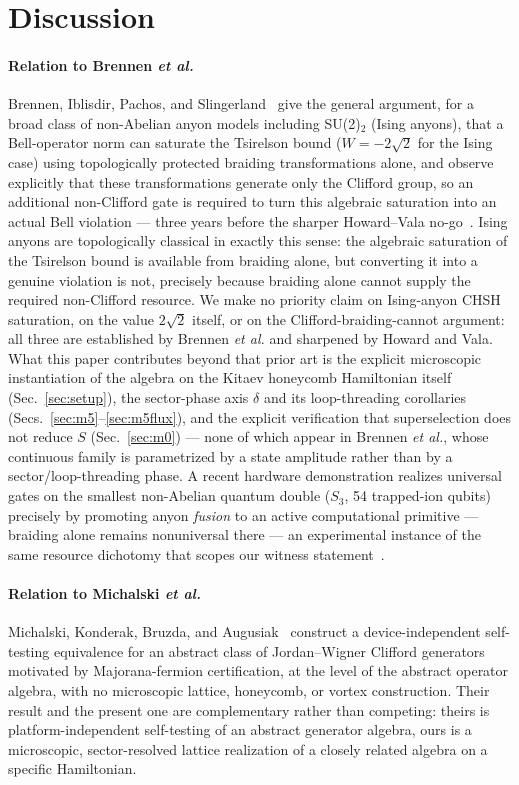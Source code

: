\documentclass[aps,pra,twocolumn,superscriptaddress,floatfix,nofootinbib]{revtex4-2}
\begin{document}
\section{Discussion}
\label{sec:discussion}

\paragraph{Relation to Brennen \emph{et al.}} Brennen, Iblisdir,
Pachos, and Slingerland~\cite{Brennen2009} give the general argument,
for a broad class of non-Abelian anyon models including SU(2)$_2$
(Ising anyons), that a Bell-operator norm can saturate the Tsirelson
bound ($W=-2\sqrt2$ for the Ising case) using topologically protected
braiding transformations alone, and observe explicitly that these
transformations generate only the Clifford group, so an additional
non-Clifford gate is required to turn this algebraic saturation into
an actual Bell violation --- three years before the sharper Howard--Vala
no-go~\cite{HowardVala2012}. Ising anyons are topologically classical
in exactly this sense: the algebraic saturation of the Tsirelson bound
is available from braiding alone, but converting it into a genuine
violation is not, precisely because braiding alone cannot supply the
required non-Clifford resource. We make no priority claim on
Ising-anyon CHSH saturation, on the value $2\sqrt2$ itself, or on the
Clifford-braiding-cannot argument: all three are established by
Brennen \emph{et al.} and sharpened by Howard and Vala. What this paper
contributes beyond that prior art is the explicit microscopic
instantiation of the algebra on the Kitaev honeycomb Hamiltonian
itself (Sec.~\ref{sec:setup}), the sector-phase axis $\delta$ and its
loop-threading corollaries (Secs.~\ref{sec:m5}--\ref{sec:m5flux}), and
the explicit verification that superselection does not reduce $S$
(Sec.~\ref{sec:m0}) --- none of which appear in Brennen \emph{et al.},
whose continuous family is parametrized by a state amplitude rather
than by a sector/loop-threading phase. A recent hardware demonstration
realizes universal gates on the smallest non-Abelian quantum double
($S_3$, 54 trapped-ion qubits) precisely by promoting anyon
\emph{fusion} to an active computational primitive --- braiding alone
remains nonuniversal there --- an experimental instance of the same
resource dichotomy that scopes our witness statement~\cite{Lo2026}.

\paragraph{Relation to Michalski \emph{et al.}} Michalski, Konderak,
Bruzda, and Augusiak~\cite{Michalski2025} construct a
device-independent self-testing equivalence for an abstract class of
Jordan--Wigner Clifford generators motivated by Majorana-fermion
certification, at the level of the abstract operator algebra, with no
microscopic lattice, honeycomb, or vortex construction. Their result
and the present one are complementary rather than competing: theirs is
platform-independent self-testing of an abstract generator algebra,
ours is a microscopic, sector-resolved lattice realization of a
closely related algebra on a specific Hamiltonian.
\end{document}
